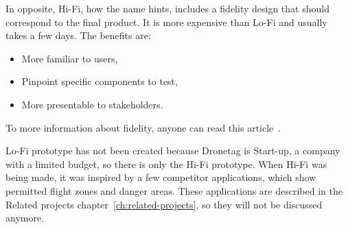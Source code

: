In opposite, Hi-Fi, how the name hints, includes a fidelity design that should correspond to the final product.
It is more expensive than Lo-Fi and usually takes a few days.
The benefits are:
\begin{itemize}
    \item More familiar to users,
    \item Pinpoint specific components to test,
    \item More presentable to stakeholders.~\cite{hiFiLoFiPrototypeArticle}
\end{itemize}
To more information about fidelity, anyone can read this article~\cite{hiFiLoFiPrototypeArticle}.

Lo-Fi prototype has not been created because Dronetag is Start-up, a company with a limited budget, so there is only the Hi-Fi prototype.
When Hi-Fi was being made, it was inspired by a few competitor applications, which show permitted flight zones and danger areas.
These applications are described in the Related projects chapter~\ref{ch:related-projects}, so they will not be discussed anymore.





